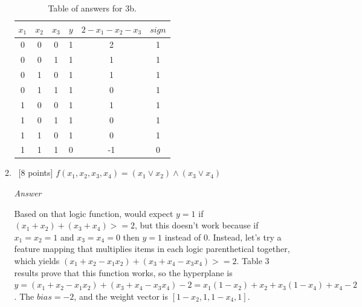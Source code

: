 \documentclass[12pt, fullpage,letterpaper]{article}
\begin{document}
\begin{enumerate}
\begin{enumerate}
		\begin{table}
        	\centering
        	\begin{tabular}{ccccc|c}
        		$x_1 $ & $x_2$ & $x_3$ & $y$ & $2-x_1-x_2-x_3$ & $sign$\\ 
        		\hline\hline
        		0 & 0 & 0 & 1 &  2 & 1 \\ \hline
        		0 & 0 & 1 & 1 &  1 & 1 \\ \hline
        		0 & 1 & 0 & 1 &  1 & 1 \\ \hline
        		0 & 1 & 1 & 1 &  0 & 1 \\ \hline
        		1 & 0 & 0 & 1 &  1 & 1 \\ \hline
        		1 & 0 & 1 & 1 &  0 & 1 \\ \hline
        		1 & 1 & 0 & 1 &  0 & 1 \\ \hline
        		1 & 1 & 1 & 0 & -1 & 0 \\ \hline
        	\end{tabular}
        	\caption{Table of answers for 3b.}\label{tb:1}
        \end{table}
		
		\item~[8 points] $f(x_1, x_2, x_3, x_4) = (x_1 \lor x_2) \land (x_3 \lor x_4)$
		
		\emph{Answer}
		
		Based on that logic function, would expect $y=1$ if $(x_1+x_2)+(x_3+x_4)>=2$, but this doesn't work because if $x_1=x_2=1$ and $x_3=x_4=0$ then $y=1$ instead of $0$. Instead, let's try a feature mapping that multiplies items in each logic parenthetical together, which yields $(x_1+x_2-x_1x_2)+(x_3+x_4-x_3x_4)>=2$. Table 3 results prove that this function works, so the hyperplane is $y=(x_1+x_2-x_1x_2)+(x_3+x_4-x_3x_4)-2=x_1(1-x_2)+x_2+x_3(1-x_4)+x_4-2$. The $bias=-2$, and the weight vector is $[1-x_2, 1, 1-x_4, 1]$.
		

\end{enumerate}
\end{enumerate}
\end{document}
